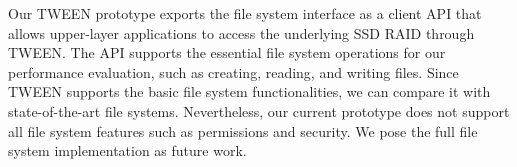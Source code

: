 Our TWEEN prototype exports the file system interface as a client API
that allows upper-layer applications to access the underlying SSD RAID through
TWEEN.  The API supports the essential file system operations for our
performance evaluation, such as creating, reading, and writing files.  Since
TWEEN supports the basic file system functionalities, we can compare it with 
state-of-the-art file systems.  Nevertheless, our
current prototype does not support all file system features such as
permissions and security.  We pose the full file system implementation as
future work.


